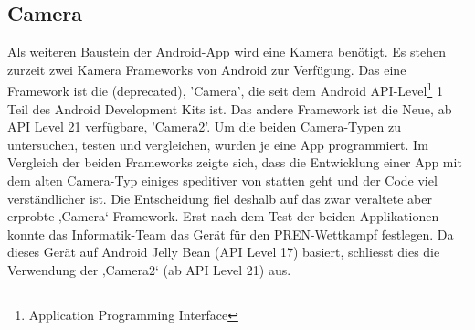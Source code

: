 \subsection{Camera}
Als weiteren Baustein der Android-App wird eine Kamera benötigt. Es stehen zurzeit 
zwei Kamera Frameworks von Android zur Verfügung. Das eine Framework ist die (deprecated)‚ 
'Camera', die seit dem Android API-Level\footnote{Application Programming Interface} 1 Teil des 
Android Development Kits ist.
\newline
Das andere Framework ist die Neue, ab API Level 21 verfügbare‚ 
'Camera2'. Um die beiden Camera-Typen zu untersuchen, testen und vergleichen, wurden je eine App programmiert.
Im Vergleich der beiden Frameworks zeigte sich, dass die Entwicklung einer App mit dem alten Camera-Typ 
einiges speditiver von statten geht und der Code viel verständlicher ist. Die Entscheidung fiel deshalb 
auf das zwar veraltete aber erprobte ‚Camera‘-Framework.
\newline
\newline
Erst nach dem Test der beiden Applikationen konnte das Informatik-Team das Gerät für den PREN-Wettkampf festlegen. 
Da dieses Gerät auf Android Jelly Bean (API Level 17) basiert, schliesst dies die Verwendung 
der ‚Camera2‘ (ab API Level 21) aus.
